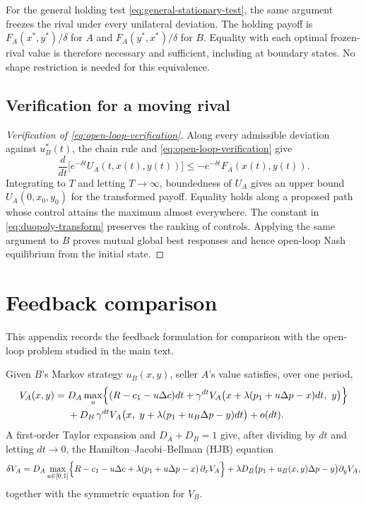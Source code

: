 \documentclass[11pt]{article}
\theoremstyle{definition}
\begin{document}
For the general holding test \eqref{eq:general-stationary-test}, the same
argument freezes the rival under every unilateral deviation. The holding
payoff is $F_A(x^*,y^*)/\delta$ for $A$ and $F_A(y^*,x^*)/\delta$ for $B$.
Equality with each optimal frozen-rival value is therefore necessary and
sufficient, including at boundary states. No shape restriction is needed
for this equivalence.

\subsection{Verification for a moving rival}\label{app:verification}

\begin{proof}[Verification of \eqref{eq:open-loop-verification}]
Along every admissible deviation against $u_B^*(t)$, the chain rule and
\eqref{eq:open-loop-verification} give
\begin{equation*}
\frac{d}{dt}\bigl[e^{-\delta t}U_A(t,x(t),y(t))\bigr]
\leq-e^{-\delta t}F_A(x(t),y(t)).
\end{equation*}
Integrating to $T$ and letting $T\to\infty$, boundedness of $U_A$ gives
an upper bound $U_A(0,x_0,y_0)$ for the transformed payoff. Equality holds
along a proposed path whose control attains the maximum almost everywhere.
The constant in \eqref{eq:duopoly-transform} preserves the ranking of
controls. Applying the same argument to $B$ proves mutual global best
responses and hence open-loop Nash equilibrium from the initial state.
\end{proof}

\section{Feedback comparison}\label{app:feedback}

This appendix records the feedback formulation for comparison with the
open-loop problem studied in the main text.

Given $B$'s Markov strategy $u_B(x,y)$, seller $A$'s value satisfies, over
one period,
\begin{align*}
V_A(x,y)={}&D_A\max_{u}\Bigl\{(R-c_1-u\Delta c)dt
+\gamma^{dt}V_A\bigl(x+\lambda(p_1+u\Delta p-x)dt,\ y\bigr)\Bigr\}\\
&+D_B\,\gamma^{dt}V_A\bigl(x,\ y+\lambda(p_1+u_B\Delta p-y)dt\bigr)+o(dt).
\end{align*}
A first-order Taylor expansion and $D_A+D_B=1$ give, after dividing by $dt$
and letting $dt\to0$, the Hamilton--Jacobi--Bellman (HJB) equation
\begin{equation}\label{eq:duopoly-HJB}
\delta V_A=D_A\max_{u\in[0,1]}\Bigl\{R-c_1-u\Delta c
+\lambda(p_1+u\Delta p-x)\,\partial_xV_A\Bigr\}
+\lambda D_B\bigl(p_1+u_B(x,y)\Delta p-y\bigr)\partial_yV_A,
\end{equation}
together with the symmetric equation for $V_B$.
\end{document}

